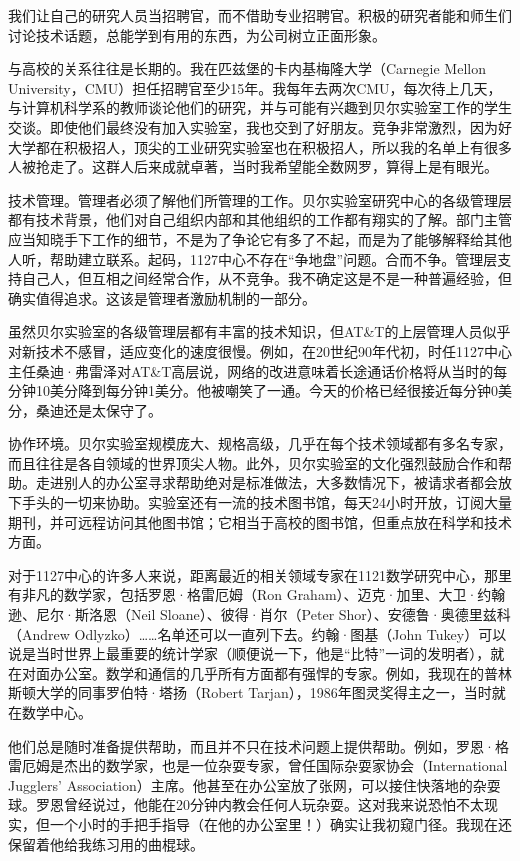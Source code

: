 \documentclass[a4paper,12pt,UTF8,twoside]{ctexbook}
\begin{document}
我们让自己的研究人员当招聘官，而不借助专业招聘官。积极的研究者能和师生们讨论技术话题，总能学到有用的东西，为公司树立正面形象。

与高校的关系往往是长期的。我在匹兹堡的卡内基梅隆大学（Carnegie Mellon University，CMU）担任招聘官至少15年。我每年去两次CMU，每次待上几天，与计算机科学系的教师谈论他们的研究，并与可能有兴趣到贝尔实验室工作的学生交谈。即使他们最终没有加入实验室，我也交到了好朋友。竞争非常激烈，因为好大学都在积极招人，顶尖的工业研究实验室也在积极招人，所以我的名单上有很多人被抢走了。这群人后来成就卓著，当时我希望能全数网罗，算得上是有眼光。

技术管理。管理者必须了解他们所管理的工作。贝尔实验室研究中心的各级管理层都有技术背景，他们对自己组织内部和其他组织的工作都有翔实的了解。部门主管应当知晓手下工作的细节，不是为了争论它有多了不起，而是为了能够解释给其他人听，帮助建立联系。起码，1127中心不存在“争地盘”问题。合而不争。管理层支持自己人，但互相之间经常合作，从不竞争。我不确定这是不是一种普遍经验，但确实值得追求。这该是管理者激励机制的一部分。

虽然贝尔实验室的各级管理层都有丰富的技术知识，但AT\&T的上层管理人员似乎对新技术不感冒，适应变化的速度很慢。例如，在20世纪90年代初，时任1127中心主任桑迪·弗雷泽对AT\&T高层说，网络的改进意味着长途通话价格将从当时的每分钟10美分降到每分钟1美分。他被嘲笑了一通。今天的价格已经很接近每分钟0美分，桑迪还是太保守了。

协作环境。贝尔实验室规模庞大、规格高级，几乎在每个技术领域都有多名专家，而且往往是各自领域的世界顶尖人物。此外，贝尔实验室的文化强烈鼓励合作和帮助。走进别人的办公室寻求帮助绝对是标准做法，大多数情况下，被请求者都会放下手头的一切来协助。实验室还有一流的技术图书馆，每天24小时开放，订阅大量期刊，并可远程访问其他图书馆；它相当于高校的图书馆，但重点放在科学和技术方面。

对于1127中心的许多人来说，距离最近的相关领域专家在1121数学研究中心，那里有非凡的数学家，包括罗恩·格雷厄姆（Ron Graham）、迈克·加里、大卫·约翰逊、尼尔·斯洛恩（Neil Sloane）、彼得·肖尔（Peter Shor）、安德鲁·奥德里兹科（Andrew Odlyzko）……名单还可以一直列下去。约翰·图基（John Tukey）可以说是当时世界上最重要的统计学家（顺便说一下，他是“比特”一词的发明者），就在对面办公室。数学和通信的几乎所有方面都有强悍的专家。例如，我现在的普林斯顿大学的同事罗伯特·塔扬（Robert Tarjan），1986年图灵奖得主之一，当时就在数学中心。

他们总是随时准备提供帮助，而且并不只在技术问题上提供帮助。例如，罗恩·格雷厄姆是杰出的数学家，也是一位杂耍专家，曾任国际杂耍家协会（International Jugglers’ Association）主席。他甚至在办公室放了张网，可以接住快落地的杂耍球。罗恩曾经说过，他能在20分钟内教会任何人玩杂耍。这对我来说恐怕不太现实，但一个小时的手把手指导（在他的办公室里！）确实让我初窥门径。我现在还保留着他给我练习用的曲棍球。
\end{document}
